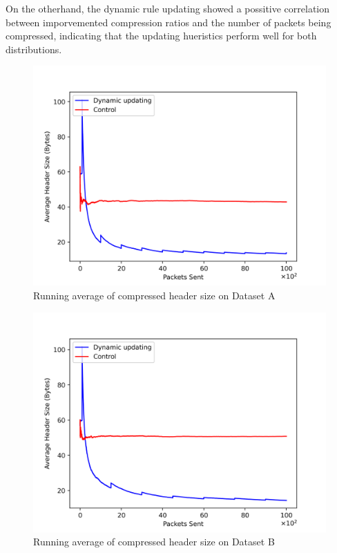 \documentclass[12pt]{dalthesis}
\begin{document}
		On the otherhand, the dynamic rule updating showed a possitive correlation between imporvemented compression ratios and the number of 
		packets being compressed, indicating that the updating hueristics perform well for both distributions.
	
		\newpage
		\begin{figure}[H]
			\centering
			\includegraphics[width=350pt]{images/b40a2.png}
			\caption{Running average of compressed header size on Dataset A}
		\end{figure}
	
	\begin{figure}[H]
			\centering
			\includegraphics[width=350pt]{images/b10a10.png}
			\caption{Running average of compressed header size on Dataset B}
		\end{figure}
\end{document}
